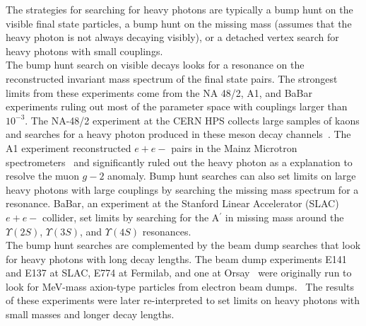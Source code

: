 The strategies for searching for heavy photons are typically a bump hunt on the visible final state particles, a bump hunt on the missing mass (assumes that the heavy photon is not always decaying visibly), or a detached vertex search for heavy photons with small couplings. \\
\indent The bump hunt search on visible decays looks for a resonance on the reconstructed invariant mass spectrum of the final state pairs. The strongest limits from these experiments come from the NA 48/2, A1, and BaBar experiments ruling out most of the parameter space with couplings larger than $10^{-3}$. The NA-48/2 experiment at the CERN HPS collects large samples of kaons and searches for a heavy photon produced in these meson decay channels~\cite{NA48}. The A1 experiment reconstructed $e+e-$ pairs in the Mainz Microtron spectrometers~\cite{A1} and significantly ruled out the heavy photon as a explanation to resolve the muon $g-2$ anomaly. Bump hunt searches can also set limits on large heavy photons with large couplings by searching the missing mass spectrum for a resonance. BaBar, an experiment at the Stanford Linear Accelerator (SLAC) $e+e-$ collider, set limits by searching for the A$^{\prime}$ in missing mass around the $\Upsilon(2S)$, $\Upsilon(3S)$, and $\Upsilon(4S)$ resonances. \\
\indent The bump hunt searches are complemented by the beam dump searches that look for heavy photons with long decay lengths. The beam dump experiments E141 and E137 at SLAC, E774 at Fermilab, and one at Orsay~\cite{OrsayBD} were originally run to look for MeV-mass axion-type particles from electron beam dumps.~\cite{limitsBD} The results of these experiments were later re-interpreted to set limits on heavy photons with small masses and longer decay lengths. \\
